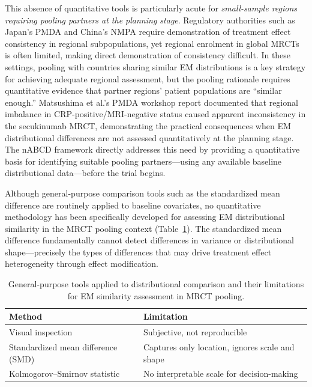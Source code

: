 \documentclass[AMA,Times1COL]{WileyNJDv5}
\begin{document}
This absence of quantitative tools is particularly acute for \emph{small-sample regions requiring pooling partners at the planning stage}. Regulatory authorities such as Japan's PMDA and China's NMPA require demonstration of treatment effect consistency in regional subpopulations,\cite{matsushima2024,song2025} yet regional enrolment in global MRCTs is often limited, making direct demonstration of consistency difficult. In these settings, pooling with countries sharing similar EM distributions is a key strategy for achieving adequate regional assessment, but the pooling rationale requires quantitative evidence that partner regions' patient populations are ``similar enough.'' Matsushima et al.'s PMDA workshop report documented that regional imbalance in CRP-positive/MRI-negative status caused apparent inconsistency in the secukinumab MRCT,\cite{matsushima2024} demonstrating the practical consequences when EM distributional differences are not assessed quantitatively at the planning stage. The nABCD framework directly addresses this need by providing a quantitative basis for identifying suitable pooling partners---using any available baseline distributional data---before the trial begins.

Although general-purpose comparison tools such as the standardized mean difference are routinely applied to baseline covariates,\cite{austin2011} no quantitative methodology has been specifically developed for assessing EM distributional similarity in the MRCT pooling context (Table~\ref{tab:limitations}). The standardized mean difference fundamentally cannot detect differences in variance or distributional shape---precisely the types of differences that may drive treatment effect heterogeneity through effect modification.

\begin{table}[ht]
\caption{General-purpose tools applied to distributional comparison and their limitations for EM similarity assessment in MRCT pooling.\label{tab:limitations}}
\begin{tabular*}{\textwidth}{@{\extracolsep\fill}ll@{}}
\toprule
\textbf{Method} & \textbf{Limitation} \\
\midrule
Visual inspection & Subjective, not reproducible \\
Standardized mean difference (SMD) & Captures only location, ignores scale and shape \\
Kolmogorov--Smirnov statistic & No interpretable scale for decision-making \\
\bottomrule
\end{tabular*}
\end{table}
\end{document}
